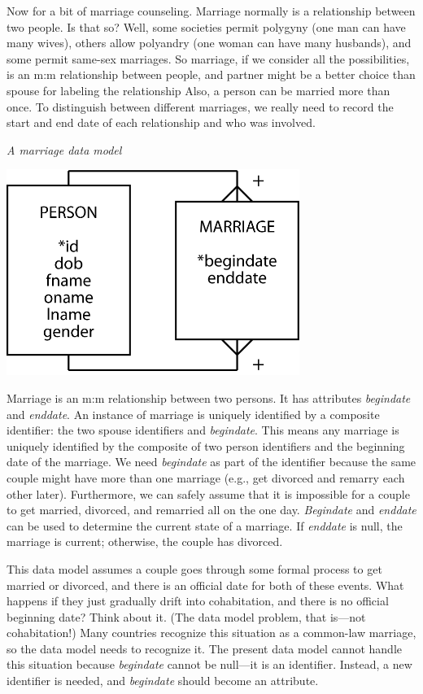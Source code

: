 \documentclass[
]{article}
\begin{document}
Now for a bit of marriage counseling. Marriage normally is a
relationship between two people. Is that so? Well, some societies permit
polygyny (one man can have many wives), others allow polyandry (one
woman can have many husbands), and some permit same-sex marriages. So
marriage, if we consider all the possibilities, is an m:m relationship
between people, and partner might be a better choice than spouse for
labeling the relationship Also, a person can be married more than once.
To distinguish between different marriages, we really need to record the
start and end date of each relationship and who was involved.

\emph{A marriage data model}

\includegraphics[width=3.75in,height=\textheight]{Figures/Chapter 7/marriage-3.png}

Marriage is an m:m relationship between two persons. It has attributes
\emph{begindate} and \emph{enddate}. An instance of marriage is uniquely
identified by a composite identifier: the two spouse identifiers and
\emph{begindate}. This means any marriage is uniquely identified by the
composite of two person identifiers and the beginning date of the
marriage. We need \emph{begindate} as part of the identifier because the same
couple might have more than one marriage (e.g., get divorced and remarry
each other later). Furthermore, we can safely assume that it is
impossible for a couple to get married, divorced, and remarried all on
the one day. \emph{Begindate} and \emph{enddate} can be used to determine the
current state of a marriage. If \emph{enddate} is null, the marriage is
current; otherwise, the couple has divorced.

This data model assumes a couple goes through some formal process to get
married or divorced, and there is an official date for both of these
events. What happens if they just gradually drift into cohabitation, and
there is no official beginning date? Think about it. (The data model
problem, that is---not cohabitation!) Many countries recognize this
situation as a common-law marriage, so the data model needs to recognize
it. The present data model cannot handle this situation because
\emph{begindate} cannot be null---it is an identifier. Instead, a new
identifier is needed, and \emph{begindate} should become an attribute.
\end{document}
